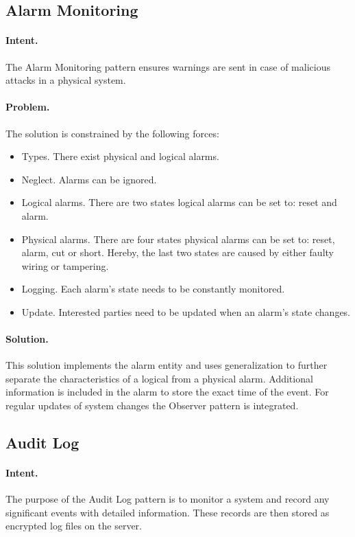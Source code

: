 \subsection{Alarm Monitoring~\cite{Fernandez2007}} 
\label{p:alarm}

\paragraph{\textbf{Intent.}} The Alarm Monitoring pattern ensures warnings are sent in case of malicious attacks in a physical system. 

\paragraph{\textbf{Problem.}} The solution is constrained by the following forces:
\begin{itemize}
	\item Types. There exist physical and logical alarms.
	\item Neglect. Alarms can be ignored.
	\item Logical alarms. There are two states logical alarms can be set to: reset and alarm.
	\item Physical alarms. There are four states physical alarms can be set to: reset, alarm, cut or short. Hereby, the last two states are caused by either faulty wiring or tampering. 
	\item Logging. Each alarm's state needs to be constantly monitored.
	\item Update. Interested parties need to be updated when an alarm's state changes.
\end{itemize}

\paragraph{\textbf{Solution.}} This solution implements the alarm entity and uses generalization to further separate the characteristics of a logical from a physical alarm. Additional information is included in the alarm to store the exact time of the event. For regular updates of system changes the Observer pattern is integrated.


\subsection{Audit Log~\cite{Lee2017, Papoutsakis2021}} 
\label{p:log}

\paragraph{\textbf{Intent.}} The purpose of the Audit Log pattern is to monitor a system and record any significant events with detailed information. These records are then stored as encrypted log files on the server. 

